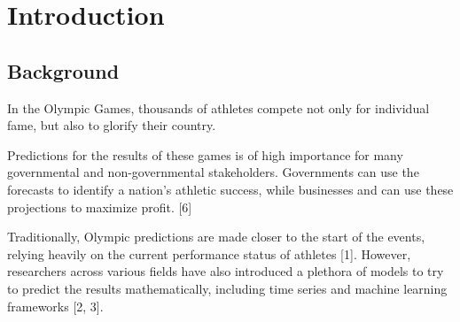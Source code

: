 \documentclass{mcmthesis}
\begin{document}
\begin{abstract}
\begin{center}
\end{center}
\end{abstract}



\maketitle
\tableofcontents

\section{Introduction}
\subsection{Background}
In the Olympic Games, thousands of athletes compete not only for individual fame, but also to glorify their country. \par
Predictions for the results of these games is of high importance for many governmental and non-governmental stakeholders. Governments can use the forecasts to identify a nation's athletic success, while businesses and can use these projections to maximize profit. 
[6] \par
Traditionally, Olympic predictions are made closer to the start of the events, relying heavily on the current performance status of athletes [1]. However, researchers across various fields have also introduced a plethora of models to try to predict the results mathematically, including time series and machine learning frameworks [2, 3].
\end{document}
